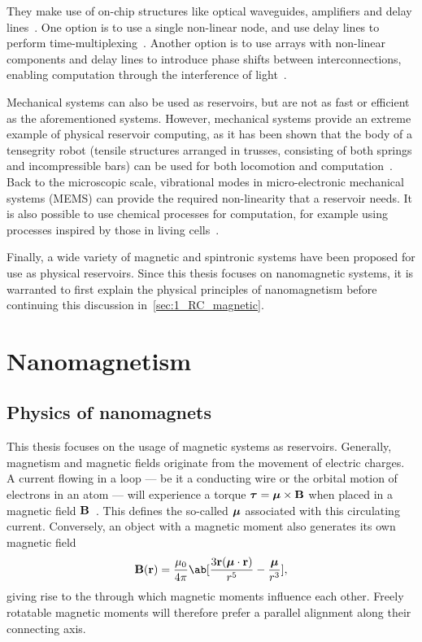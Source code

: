 They make use of on-chip structures like optical waveguides, amplifiers and delay lines~\cite{RC_RecentAdvances}.
One option is to use a single non-linear node, and use delay lines to perform time-multiplexing~\cite{appeltant2011information,RC_AllOptical}.
Another option is to use arrays with non-linear components and delay lines to introduce phase shifts between interconnections, enabling computation through the interference of light~\cite{RC_Photonic,RC_PhotonicSi}. \par
Mechanical systems can also be used as reservoirs, but are not as fast or efficient as the aforementioned systems.
However, mechanical systems provide an extreme example of physical reservoir computing, as it has been shown that the body of a tensegrity robot (tensile structures arranged in trusses, consisting of both springs and incompressible bars) can be used for both locomotion and computation~\cite{RC_Tensegrity}.
Back to the microscopic scale, vibrational modes in micro-electronic mechanical systems (MEMS) can provide the required non-linearity that a reservoir needs.
It is also possible to use chemical processes for computation, for example using processes inspired by those in living cells~\cite{NanoscaleRC,ElectrochemicalPRC,RC_Chemical}. \par
Finally, a wide variety of magnetic and spintronic systems have been proposed for use as physical reservoirs.
Since this thesis focuses on nanomagnetic systems, it is warranted to first explain the physical principles of nanomagnetism before continuing this discussion in~\cref{sec:1_RC_magnetic}.

\newpage
\section{Nanomagnetism} \label{sec:1:Nanomagnetism}
\subsection{Physics of nanomagnets}
This thesis focuses on the usage of magnetic systems as reservoirs.
Generally, magnetism and magnetic fields originate from the movement of electric charges.
A current flowing in a loop --- be it a conducting wire or the orbital motion of electrons in an atom --- will experience a torque $\boldsymbol{\mathbf{\tau}} = \boldsymbol{\mathbf{\mu}} \times \boldsymbol{\mathbf{B}}$ when placed in a magnetic field $\boldsymbol{\mathbf{B}}$~\cite{IntroMagneticMaterials}.
This defines the so-called  $\boldsymbol{\mathbf{\mu}}$ associated with this circulating current.
Conversely, an object with a magnetic moment also generates its own magnetic field
\begin{equation}
	\vc{B}(\vc{r}) = \frac{\mu_0}{4 \pi} \ab[\frac{3 \vc{r} (\vc{\mu} \cdot \vc{r})}{r^5} - \frac{\vc{\mu}}{r^3}] \mathrm{,}
\end{equation}
giving rise to the  through which magnetic moments influence each other. %
Freely rotatable magnetic moments will therefore prefer a parallel alignment along their connecting axis.

